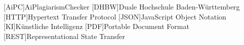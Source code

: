 \addchap*{\langacronyms}
\begin{acronym}
  [AiPC]{AiPlagiarismChecker}
  [DHBW]{Duale Hochschule Ba\-den-\-Würt\-tem\-berg}
  [HTTP]{Hypertext Transfer Protocol}
  [JSON]{JavaScript Object Notation}
  [KI]{Künstliche Intelligenz}
  [PDF]{Portable Document Format}
  [REST]{Representational State Transfer}
\end{acronym}